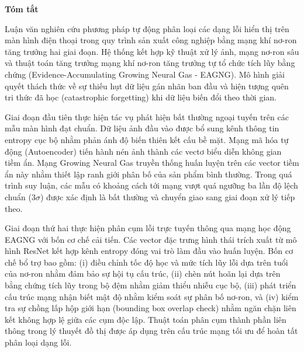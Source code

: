 \begin{center}
\textbf{\large{Tóm tắt}}
\end{center}


\begin{small}

Luận văn nghiên cứu phương pháp tự động phân loại các dạng lỗi hiển thị trên màn hình điện thoại trong quy trình sản xuất công nghiệp bằng mạng khí nơ-ron tăng trưởng hai giai đoạn. Hệ thống kết hợp kỹ thuật xử lý ảnh, mạng nơ-ron sâu và thuật toán tăng trưởng mạng khí nơ-ron tăng trưởng tự tổ chức tích lũy bằng chứng (Evidence-Accumulating Growing Neural Gas - EAGNG). Mô hình giải quyết thách thức về sự thiếu hụt dữ liệu gán nhãn ban đầu và hiện tượng quên tri thức đã học (catastrophic forgetting) khi dữ liệu biến đổi theo thời gian.

Giai đoạn đầu tiên thực hiện tác vụ phát hiện bất thường ngoại tuyến trên các mẫu màn hình đạt chuẩn. Dữ liệu ảnh đầu vào được bổ sung kênh thông tin entropy cục bộ nhằm phản ánh độ biến thiên kết cấu bề mặt. Mạng mã hóa tự động (Autoencoder) tiến hành nén ảnh thành các vectơ biểu diễn không gian tiềm ẩn. Mạng Growing Neural Gas truyền thống huấn luyện trên các vector tiềm ẩn này nhằm thiết lập ranh giới phân bố của sản phẩm bình thường. Trong quá trình suy luận, các mẫu có khoảng cách tới mạng vượt quá ngưỡng ba lần độ lệch chuẩn ($3\sigma$) được xác định là bất thường và chuyển giao sang giai đoạn xử lý tiếp theo.

Giai đoạn thứ hai thực hiện phân cụm lỗi trực tuyến thông qua mạng học động EAGNG với bốn cơ chế cải tiến. Các vector đặc trưng hình thái trích xuất từ mô hình ResNet kết hợp kênh entropy đóng vai trò làm đầu vào huấn luyện. Bốn cơ chế bổ trợ bao gồm: (i) điều chỉnh tốc độ học và mức tích lũy lỗi dựa trên tuổi của nơ-ron nhằm đảm bảo sự hội tụ cấu trúc, (ii) chèn nút hoãn lại dựa trên bằng chứng tích lũy trong bộ đệm nhằm giảm thiểu nhiễu cục bộ, (iii) phát triển cấu trúc mạng nhận biết mật độ nhằm kiểm soát sự phân bố nơ-ron, và (iv) kiểm tra sự chồng lấp hộp giới hạn (bounding box overlap check) nhằm ngăn chặn liên kết không hợp lệ giữa các cụm độc lập. Thuật toán phân cụm thành phần liên thông trong lý thuyết đồ thị được áp dụng trên cấu trúc mạng tối ưu để hoàn tất phân loại dạng lỗi.


\end{small}
